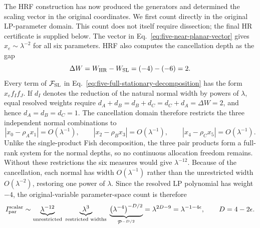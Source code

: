 \documentclass[a4paper,11pt]{article}
\newcommand{\FSL}{\mathcal F_{\rm SL}}
\newcommand{\WSL}{W_{\rm SL}}
\newcommand{\WHR}{W_{\rm HR}}
\begin{document}
The HRF construction has now produced the generators and determined the
scaling vector in the original coordinates.  We first count directly in the
original LP-parameter domain.  This count does not itself require dissection;
the final HR certificate is supplied below.  The vector in
Eq.~\eqref{eq:five-near-planar-vector} gives
\(x_e\sim\lambda^{-2}\) for all six parameters.  HRF also computes the
cancellation depth as the gap
\begin{equation}
 \Delta W=\WHR-\WSL=(-4)-(-6)=2.
 \label{eq:five-near-planar-cancellation-depth}
\end{equation}
Every term of \(\FSL\) in
Eq.~\eqref{eq:five-full-stationary-decomposition} has the form
\(x_e f_I f_J\).  If \(d_I\) denotes the reduction of the natural normal
width by powers of \(\lambda\), equal resolved weights require
\(d_A+d_B=d_B+d_C=d_C+d_A=\Delta W=2\), and hence
\(d_A=d_B=d_C=1\).  The cancellation domain therefore restricts the three
independent normal combinations to
\begin{equation}
 |x_0-\rho_Ax_1|=O(\lambda^{-1}),\qquad
 |x_2-\rho_Bx_3|=O(\lambda^{-1}),\qquad
 |x_4-\rho_Cx_5|=O(\lambda^{-1}).
 \label{eq:five-near-planar-restricted-domain}
\end{equation}
Unlike the single-product Fish decomposition, the three pair products form a
full-rank system for the normal depths, so no continuous allocation freedom
remains.
Without these restrictions the six measures would give
\(\lambda^{-12}\).  Because of the cancellation, each normal has width
\(O(\lambda^{-1})\) rather than the unrestricted width
\(O(\lambda^{-2})\), restoring one power of \(\lambda\).  Since the
resolved LP polynomial has weight \(-4\), the
original-variable parameter-space count is therefore
\begin{equation}
 I_{\rm par}^{\rm scalar}
 \sim
 \underbrace{\lambda^{-12}}_{\text{unrestricted}}
 \;\underbrace{\lambda^{3}}_{\text{restricted widths}}
 \;\underbrace{\bigl(\lambda^{-4}\bigr)^{-D/2}}_{\mathcal P^{-D/2}}
 =\lambda^{2D-9}=\lambda^{-1-4\epsilon},
 \qquad D=4-2\epsilon.
 \label{eq:five-near-planar-parameter-power}
\end{equation}
\end{document}
